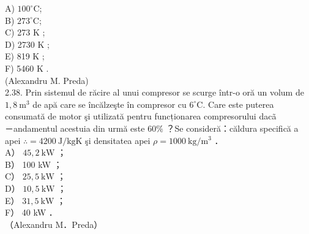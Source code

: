 \documentclass[10pt]{article}
\begin{document}
A) $100^{\circ} \mathrm{C}$;\\
B) $273^{\circ} \mathrm{C}$;\\
C) 273 K ;\\
D) 2730 K ;\\
E) 819 K ;\\
F) 5460 K .\\
(Alexandru M. Preda)\\
2.38. Prin sistemul de răcire al unui compresor se scurge într-o oră un volum de $1,8 \mathrm{~m}^{3}$ de apă care se încălzeşte în compresor cu $6^{\circ} \mathrm{C}$. Care este puterea consumată de motor şi utilizată pentru funcționarea compresorului dacã\\
－andamentul acestuia din urmă este $60 \%$ ？Se consideră：căldura specifică a apei $\therefore=4200 \mathrm{~J} / \mathrm{kgK}$ şi densitatea apei $\rho=1000 \mathrm{~kg} / \mathrm{m}^{3}$ ．\\
A） $45,2 \mathrm{~kW}$ ；\\
B） 100 kW ；\\
C） $25,5 \mathrm{~kW}$ ；\\
D） $10,5 \mathrm{~kW}$ ；\\
E） $31,5 \mathrm{~kW}$ ；\\
F） 40 kW ．\\
（Alexandru M．Preda）
\end{document}
